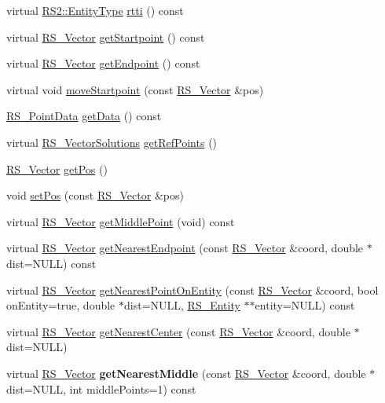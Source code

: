 \begin{DoxyCompactItemize}
\item 
virtual \hyperlink{classRS2_a8f26d1b981e1e85cff16738b43337e6a}{R\-S2\-::\-Entity\-Type} \hyperlink{classRS__Point_aa79dfbc501e969fc427e625975a43280}{rtti} () const 
\item 
virtual \hyperlink{classRS__Vector}{R\-S\-\_\-\-Vector} \hyperlink{classRS__Point_a81a945a2d3f7e0bb331f277a2983dac4}{get\-Startpoint} () const 
\item 
virtual \hyperlink{classRS__Vector}{R\-S\-\_\-\-Vector} \hyperlink{classRS__Point_ad67165979895eb23399aa453e0ab5a3b}{get\-Endpoint} () const 
\item 
virtual void \hyperlink{classRS__Point_add44dca9ada6e53fb53e3293f6770f50}{move\-Startpoint} (const \hyperlink{classRS__Vector}{R\-S\-\_\-\-Vector} \&pos)
\item 
\hyperlink{classRS__PointData}{R\-S\-\_\-\-Point\-Data} \hyperlink{classRS__Point_ad2c29faeb97a99c5c17e32fd61f83588}{get\-Data} () const 
\item 
virtual \hyperlink{classRS__VectorSolutions}{R\-S\-\_\-\-Vector\-Solutions} \hyperlink{classRS__Point_a7afd6f7b7e6f245b91d9dcd361429b61}{get\-Ref\-Points} ()
\item 
\hyperlink{classRS__Vector}{R\-S\-\_\-\-Vector} \hyperlink{classRS__Point_a8eb34a64fcef75e32596c5228fdc2e8f}{get\-Pos} ()
\item 
void \hyperlink{classRS__Point_a572b1b6e4d2dc1e8b2518d48dde82aed}{set\-Pos} (const \hyperlink{classRS__Vector}{R\-S\-\_\-\-Vector} \&pos)
\item 
virtual \hyperlink{classRS__Vector}{R\-S\-\_\-\-Vector} \hyperlink{classRS__Point_a35bc09480f6b4af6985f5a11107493a6}{get\-Middle\-Point} (void) const 
\item 
virtual \hyperlink{classRS__Vector}{R\-S\-\_\-\-Vector} \hyperlink{classRS__Point_a9f2967db56a29c1834ed91eb14a08dcb}{get\-Nearest\-Endpoint} (const \hyperlink{classRS__Vector}{R\-S\-\_\-\-Vector} \&coord, double $\ast$dist=N\-U\-L\-L) const 
\item 
virtual \hyperlink{classRS__Vector}{R\-S\-\_\-\-Vector} \hyperlink{classRS__Point_af557cb9d0f00176bad428624b35b36a2}{get\-Nearest\-Point\-On\-Entity} (const \hyperlink{classRS__Vector}{R\-S\-\_\-\-Vector} \&coord, bool on\-Entity=true, double $\ast$dist=N\-U\-L\-L, \hyperlink{classRS__Entity}{R\-S\-\_\-\-Entity} $\ast$$\ast$entity=N\-U\-L\-L) const 
\item 
virtual \hyperlink{classRS__Vector}{R\-S\-\_\-\-Vector} \hyperlink{classRS__Point_a5dfb203abfd78b2dccc026ff17679180}{get\-Nearest\-Center} (const \hyperlink{classRS__Vector}{R\-S\-\_\-\-Vector} \&coord, double $\ast$dist=N\-U\-L\-L)
\item 
\hypertarget{classRS__Point_ae52248216144a618676f3b5717a1e1c6}{virtual \hyperlink{classRS__Vector}{R\-S\-\_\-\-Vector} {\bfseries get\-Nearest\-Middle} (const \hyperlink{classRS__Vector}{R\-S\-\_\-\-Vector} \&coord, double $\ast$dist=N\-U\-L\-L, int middle\-Points=1) const }\label{classRS__Point_ae52248216144a618676f3b5717a1e1c6}


\end{DoxyCompactItemize}
